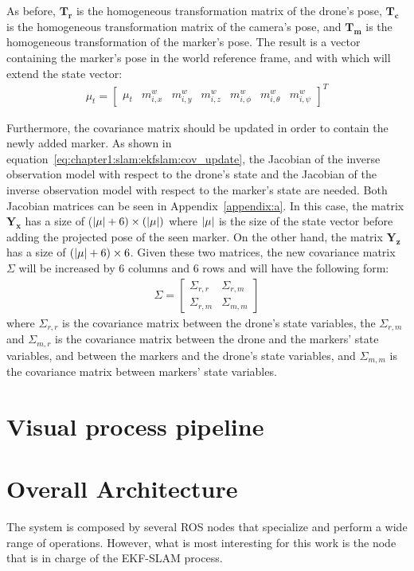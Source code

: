 As before, $\bm{T_r}$ is the homogeneous transformation matrix of the drone's pose, $\bm{T_c}$ is the homogeneous transformation matrix of the camera's pose, and $\bm{T_m}$ is the homogeneous transformation of the marker's pose. The result is a vector containing the marker's pose in the world reference frame, and with which will extend the state vector:
\begin{align*}
    \mu_t = \left[\begin{array}{c|cccccc}
        \mu_t & m_{i, x}^w & m_{i, y}^w & m_{i, z}^w & m_{i, \phi}^w & m_{i, \theta}^w & m_{i, \psi}^w
    \end{array}
    \right]^T
\end{align*}

Furthermore, the covariance matrix should be updated in order to contain the newly added marker. As shown in equation~\ref{eq:chapter1:slam:ekfslam:cov_update}, the Jacobian of the inverse observation model with respect to the drone's state and the Jacobian of the inverse observation model with respect to the marker's state are needed. Both Jacobian matrices can be seen in Appendix~\ref{appendix:a}. In this case, the matrix $\bm{Y_x}$ has a size of ($\lvert \mu \rvert+6) \times (\lvert \mu \rvert)$ where $\lvert \mu \rvert$ is the size of the state vector before adding the projected pose of the seen marker. On the other hand, the matrix $\bm{Y_z}$ has a size of $(\lvert \mu \rvert+6) \times 6$. Given these two matrices, the new covariance matrix $\Sigma$ will be increased by 6 columns and 6 rows and will have the following form:
\begin{align*}
    \Sigma = \begin{bmatrix}
        \Sigma_{r,r} & \Sigma_{r,m} \\ \Sigma_{r,m} & \Sigma_{m,m}
    \end{bmatrix}
\end{align*}
where $\Sigma_{r,r}$ is the covariance matrix between the drone's state variables, the $\Sigma_{r,m}$ and $\Sigma_{m,r}$ is the covariance matrix between the drone and the markers' state variables, and between the markers and the drone's state variables, and $\Sigma_{m,m}$ is the covariance matrix between markers' state variables.

\section{Visual process pipeline}
\label{sec:chapter2:visual}

\section{Overall Architecture}
\label{sec:chapter2:arch}
The system is composed by several ROS nodes that specialize and perform a wide range of operations. However, what is most interesting for this work is the node that is in charge of the EKF-SLAM process. \\

